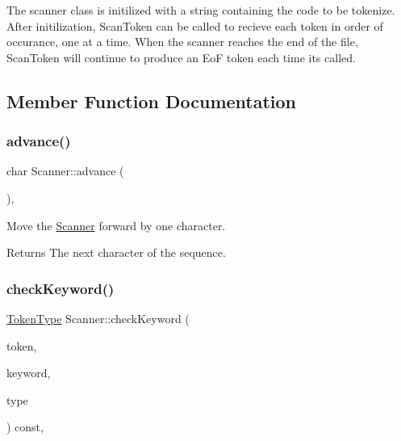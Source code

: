The scanner class is initilized with a string containing the code to be tokenize. After initilization, Scan\+Token can be called to recieve each token in order of occurance, one at a time. When the scanner reaches the end of the file, Scan\+Token will continue to produce an EoF token each time it\textquotesingle{}s called. 

\subsection{Member Function Documentation}
\mbox{\label{class_scanner_a48162dd3db322ae58745bacacd98c463}} 
\subsubsection{\texorpdfstring{advance()}{advance()}}
{\footnotesize\ttfamily char Scanner\+::advance (\begin{DoxyParamCaption}{ }\end{DoxyParamCaption})\hspace{0.3cm}{\ttfamily [inline]}, {\ttfamily [private]}}



Move the \hyperlink{class_scanner}{Scanner} forward by one character. 

\begin{DoxyReturn}{Returns}
The next character of the sequence. 
\end{DoxyReturn}
\mbox{\label{class_scanner_a078d11dc2b435cd82d4673f34aa531ad}} 
\subsubsection{\texorpdfstring{check\+Keyword()}{checkKeyword()}}
{\footnotesize\ttfamily \hyperlink{_scanner_8h_aa520fbf142ba1e7e659590c07da31921}{Token\+Type} Scanner\+::check\+Keyword (\begin{DoxyParamCaption}\item[{const std\+::string \&}]{token,  }\item[{const std\+::string \&}]{keyword,  }\item[{\hyperlink{_scanner_8h_aa520fbf142ba1e7e659590c07da31921}{Token\+Type}}]{type }\end{DoxyParamCaption}) const\hspace{0.3cm}{\ttfamily [inline]}, {\ttfamily [private]}}



